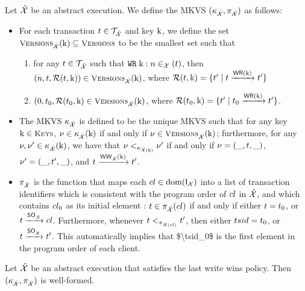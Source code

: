 \begin{definition}
Let $\hat{\mathcal{X}}$ be an abstract execution. 
We define the MKVS $(\kappa_{\hat{\mathcal{X}}}, \pi_{\hat{\mathcal{X}}})$ as follows: 
\begin{itemize}
\item For each transaction $t \in \mathcal{T}_{\hat{\mathcal{X}}}$ and key $\mathrm{k}$, 
we define the set $\Versions_{\hat{\aexec}}(\key{k}) \subseteq \Versions$ to be the smallest set such that 
\begin{enumerate}
\item for any $t \in \mathcal{T}_{\hat{\mathcal{X}}}$ such that ${{\tt WR}}\;\mathrm{k}: n \in_{\mathcal{X}} \mathscr{(}t)$,
then
$(n, \tsid, \mathcal{R}(\tsid, \key{k})) \in \Versions_{\hat{\aexec}}(\key{k})$, 
where $\mathcal{R}(t, \mathrm{k}) = \{t' \mid t \xrightarrow{{\mathsf{WR}}(\mathrm{k})} t'\}$ 
\item $(0, \tsid_0, \mathcal{R}(\tsid_{0}, \key{k}) \in \Versions_{\hat{\aexec}}(\key{k})$, 
where $\mathcal{R}(t_{0}, \mathrm{k}) = \{t' \mid t_0 \xrightarrow{{\mathsf{WR}}(\mathrm{k})} t'\}$.
\end{enumerate}
\item The MKVS $\kappa_{\hat{\mathcal{X}}}$ is defined to be the unique MKVS such that 
for any key $\key{k} \in \Addr$, $\nu \in \kappa_{\hat{\mathcal{X}}}(\mathrm{k})$ if and only if 
$\nu \in \Versions_{\hat{\aexec}}(\key{k})$; furthermore, for any $\nu, \nu' \in \kappa_{\hat{\mathcal{X}}}(\mathrm{k})$, 
we have that $\nu <_{\kappa_{\hat{\mathcal{X}}(\mathrm{k})}} \nu'$ if and only if $\nu = (\_, t, \_)$, 
$\nu' = (\_, t', \_)$, and $t \xrightarrow{{\mathsf{WW}}_{\hat{\mathcal{X}}}(\mathrm{k})} t'$.
\item $\pi_{\hat{\mathcal{X}}}$ is the function that maps each $cl \in \operatorname{dom}(\mathsf{I}_{\mathcal{X}})$ into a list of transaction 
identifiers which is consistent with the program order of $cl$ in $\hat{\mathcal{X}}$, and which 
contains $cl_0$ as its initial element : $t \in \pi_{\hat{\mathcal{X}}}(cl)$ 
if and only if either $t = t_0$, or $t \xrightarrow{{\sf{SO}}_{\hat{\mathcal{X}}}} cl$. 
Furthermore, whenever $t <_{\pi_{\hat{\mathcal{X}}(cl)}} t'$, then either 
$tsid = t_0$, or $t \xrightarrow{{\sf{SO}}_{\hat{\mathcal{X}}}} t'$. 
\ac{This automatically implies that $\tsid_0$ is the first element in the program order 
of each client.}
\end{itemize}
\end{definition}

\begin{proposition}
Let $\hat{\mathcal{X}}$ be an abstract execution that satisfies the last write wins policy. 
Then $(\kappa_{\hat{\mathcal{X}}}, \pi_{\hat{\mathcal{X}}})$ is well-formed.
\end{proposition}


